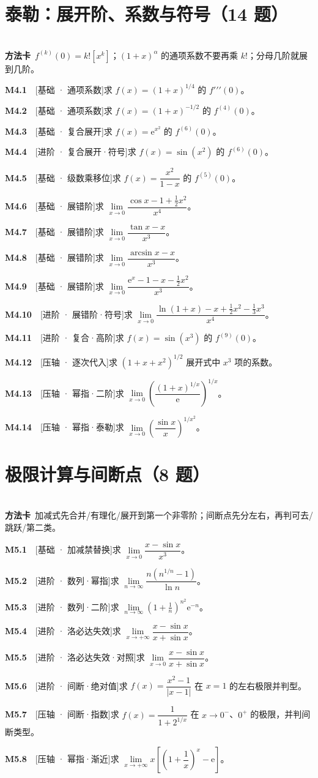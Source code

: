 \documentclass[11pt,a4paper]{ctexart}
\newcommand{\ee}{\mathrm{e}}
\newcommand{\qi}[3]{\par\noindent\textbf{#1}\ \ {\footnotesize[#2]}\quad #3\par\smallskip}
\begin{document}
\section{泰勒：展开阶、系数与符号（14 题）}
\\[0.3em]
\noindent\textbf{方法卡}\ $f^{(k)}(0)=k![x^k]$；$(1+x)^\alpha$ 的通项系数不要再乘 $k!$；分母几阶就展到几阶。\\[0.5em]
\qi{M4.1}{基础 · 通项系数}{求 $f(x)=(1+x)^{1/4}$ 的 $f\prime\prime\prime(0)$。}
\qi{M4.2}{基础 · 通项系数}{求 $f(x)=(1+x)^{-1/2}$ 的 $f^{(4)}(0)$。}
\qi{M4.3}{基础 · 复合展开}{求 $f(x)=\ee^{x^{2}}$ 的 $f^{(6)}(0)$。}
\qi{M4.4}{进阶 · 复合展开·符号}{求 $f(x)=\sin(x^{2})$ 的 $f^{(6)}(0)$。}
\qi{M4.5}{基础 · 级数乘移位}{求 $f(x)=\dfrac{x^{2}}{1-x}$ 的 $f^{(5)}(0)$。}
\qi{M4.6}{基础 · 展错阶}{求 $\lim\limits_{x\to0}\dfrac{\cos x-1+\tfrac12x^{2}}{x^{4}}$。}
\qi{M4.7}{基础 · 展错阶}{求 $\lim\limits_{x\to0}\dfrac{\tan x-x}{x^{3}}$。}
\qi{M4.8}{基础 · 展错阶}{求 $\lim\limits_{x\to0}\dfrac{\arcsin x-x}{x^{3}}$。}
\qi{M4.9}{基础 · 展错阶}{求 $\lim\limits_{x\to0}\dfrac{\ee^{x}-1-x-\tfrac12x^{2}}{x^{3}}$。}
\qi{M4.10}{进阶 · 展错阶·符号}{求 $\lim\limits_{x\to0}\dfrac{\ln(1+x)-x+\tfrac12x^{2}-\tfrac13x^{3}}{x^{4}}$。}
\qi{M4.11}{进阶 · 复合·高阶}{求 $f(x)=\sin(x^{3})$ 的 $f^{(9)}(0)$。}
\qi{M4.12}{压轴 · 逐次代入}{求 $(1+x+x^{2})^{1/2}$ 展开式中 $x^{3}$ 项的系数。}
\qi{M4.13}{压轴 · 幂指·二阶}{求 $\lim\limits_{x\to0}\left(\dfrac{(1+x)^{1/x}}{\ee}\right)^{1/x}$。}
\qi{M4.14}{压轴 · 幂指·泰勒}{求 $\lim\limits_{x\to0}\left(\dfrac{\sin x}{x}\right)^{1/x^{2}}$。}
\section{极限计算与间断点（8 题）}
\\[0.3em]
\noindent\textbf{方法卡}\ 加减式先合并/有理化/展开到第一个非零阶；间断点先分左右，再判可去/跳跃/第二类。\\[0.5em]
\qi{M5.1}{基础 · 加减禁替换}{求 $\lim\limits_{x\to0}\dfrac{x-\sin x}{x^{3}}$。}
\qi{M5.2}{进阶 · 数列·幂指}{求 $\lim\limits_{n\to\infty}\dfrac{n(n^{1/n}-1)}{\ln n}$。}
\qi{M5.3}{进阶 · 数列·二阶}{求 $\lim\limits_{n\to\infty}(1+\tfrac1n)^{n^{2}}\ee^{-n}$。}
\qi{M5.4}{进阶 · 洛必达失效}{求 $\lim\limits_{x\to+\infty}\dfrac{x-\sin x}{x+\sin x}$。}
\qi{M5.5}{进阶 · 洛必达失效·对照}{求 $\lim\limits_{x\to0}\dfrac{x-\sin x}{x+\sin x}$。}
\qi{M5.6}{进阶 · 间断·绝对值}{求 $f(x)=\dfrac{x^{2}-1}{|x-1|}$ 在 $x=1$ 的左右极限并判型。}
\qi{M5.7}{压轴 · 间断·指数}{求 $f(x)=\dfrac1{1+2^{1/x}}$ 在 $x\to0^{-}$、$0^{+}$ 的极限，并判间断类型。}
\qi{M5.8}{压轴 · 幂指·渐近}{求 $\lim\limits_{x\to+\infty}x\left[\left(1+\dfrac1x\right)^{x}-\ee\right]$。}
\end{document}
